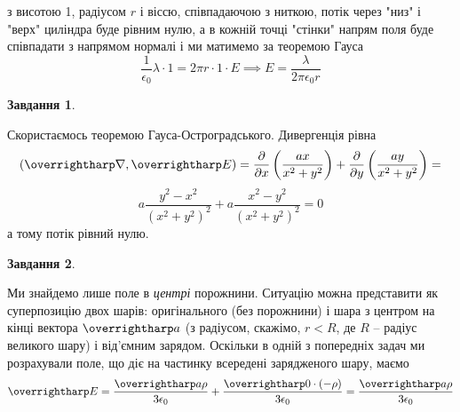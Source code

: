 \documentclass[12pt]{article} %
\newtheorem{prob}{Завдання}
\begin{document}
	з висотою 1, радіусом $r$ і віссю, співпадаючою з ниткою, потік через "низ" і "верх" циліндра буде рівним нулю, а в кожній точці "стінки"
	напрям поля буде співпадати з напрямом нормалі і ми матимемо за теоремою Гауса
	\[\frac{1}{\epsilon_0}\lambda\cdot1=2\pi r\cdot 1\cdot E\implies E=\frac{\lambda}{2\pi\epsilon_0 r}\]
\begin{prob}\end{prob}%
	Скористаємось теоремою Гауса-Остроградського. Дивергенція рівна
	\[(\myvec{\nabla},\myvec{E})=\frac{\partial}{\partial x}\mybra{\frac{ax}{x^2+y^2}}+\frac{\partial}{\partial y}\mybra{\frac{ay}{x^2+y^2}}=\]
	\[a\frac{y^2-x^2}{(x^2+y^2)^2}+a\frac{x^2-y^2}{(x^2+y^2)^2}=0\]
	а тому потік рівний нулю.
\begin{prob}\end{prob}%
	Ми знайдемо лише поле в \textit{центрі} порожнини. Ситуацію можна представити як суперпозицію двох шарів: оригінального (без порожнини)
	і шара з центром на кінці вектора $\myvec{a}$ (з радіусом, скажімо, $r<R$, де $R$ -- радіус великого шару) і від’ємним зарядом. Оскільки
	в одній з попередніх задач ми розрахували поле, що діє на частинку всередені зарядженого шару, маємо
	\[\myvec{E}=\frac{\myvec{a}\rho}{3\epsilon_0}+\frac{\myvec{0}\cdot(-\rho)}{3\epsilon_0}=\frac{\myvec{a}\rho}{3\epsilon_0}\]
\end{document}
